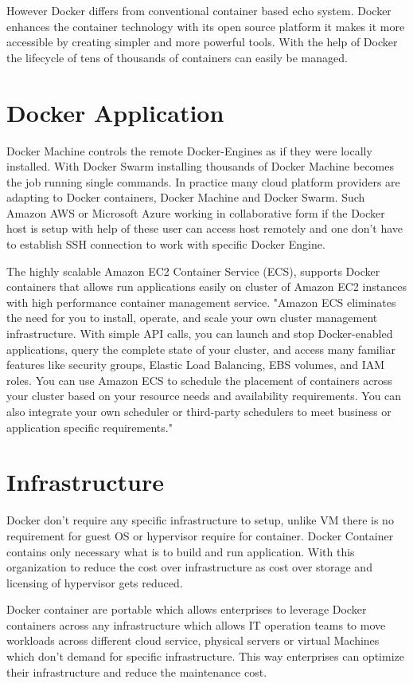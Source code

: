 \documentclass{acm_proc_article-sp}
\begin{document}
However Docker differs from conventional container based echo system. Docker enhances the container technology with its open source platform it makes it more accessible by creating simpler and more powerful tools. With the help of Docker the lifecycle of tens of thousands of containers can easily be managed.

\section{Docker Application}
Docker Machine controls the remote Docker-Engines as if they were locally installed. With Docker Swarm installing thousands of Docker Machine becomes the job running single commands. In practice many cloud platform providers are adapting to Docker containers, Docker Machine and Docker Swarm. Such Amazon AWS or Microsoft Azure working in collaborative form if the Docker host is setup with help of these user can access host remotely and one don't have to establish SSH connection to work with specific Docker Engine.

The highly scalable Amazon EC2 Container Service (ECS), supports Docker containers that allows run applications easily on cluster of Amazon EC2 instances with high performance container management service. "Amazon ECS eliminates the need for you to install, operate, and scale your own cluster management infrastructure. With simple API calls, you can launch and stop Docker-enabled applications, query the complete state of your cluster, and access many familiar features like security groups, Elastic Load Balancing, EBS volumes, and IAM roles. You can use Amazon ECS to schedule the placement of containers across your cluster based on your resource needs and availability requirements. You can also integrate your own scheduler or third-party schedulers to meet business or application specific requirements."\cite{ECS} 

\section{Infrastructure}
Docker don't require any specific infrastructure to setup, unlike VM there is no requirement for guest OS or hypervisor require for container. Docker Container contains only necessary what is to build and run application. With this organization to reduce the cost over infrastructure as cost over storage and licensing of hypervisor gets reduced.

Docker container are portable which allows enterprises to leverage Docker containers across any infrastructure which allows IT operation teams to move workloads across different cloud service, physical servers or virtual Machines which don't demand for specific infrastructure. This way enterprises can optimize their infrastructure and reduce the maintenance cost.
\end{document}

